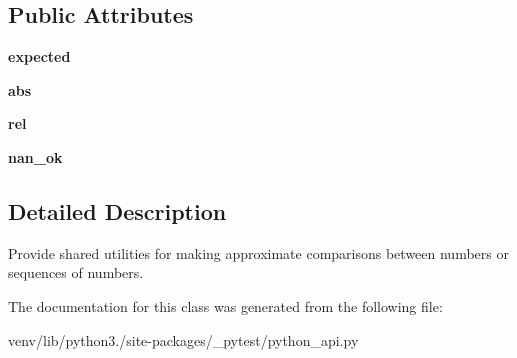 \subsection*{Public Attributes}
\begin{DoxyCompactItemize}
\item 
\mbox{\label{class__pytest_1_1python__api_1_1_approx_base_aac0bb006394d73366dc72f44e61c11fd}} 
{\bfseries expected}
\item 
\mbox{\label{class__pytest_1_1python__api_1_1_approx_base_a6862bbae94147a9837f7d15e0e84d8ee}} 
{\bfseries abs}
\item 
\mbox{\label{class__pytest_1_1python__api_1_1_approx_base_a11749ff983de0e5feb70a30cc2aa8476}} 
{\bfseries rel}
\item 
\mbox{\label{class__pytest_1_1python__api_1_1_approx_base_a27c3ed180412800f50f6ea5ed5991b0a}} 
{\bfseries nan\+\_\+ok}
\end{DoxyCompactItemize}


\subsection{Detailed Description}
\begin{DoxyVerb}Provide shared utilities for making approximate comparisons between numbers
or sequences of numbers.
\end{DoxyVerb}
 

The documentation for this class was generated from the following file\+:\begin{DoxyCompactItemize}
\item 
venv/lib/python3./site-\/packages/\+\_\+pytest/python\+\_\+api.\+py\end{DoxyCompactItemize}
